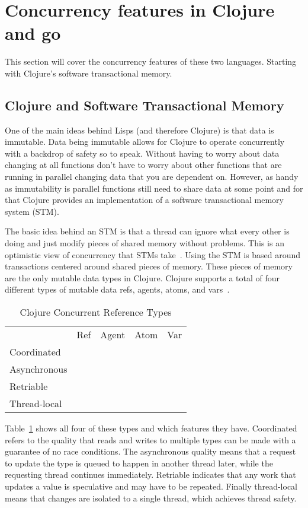 \documentclass{acm_proc_article-sp}
\begin{document}
	\section{Concurrency features in Clojure and go}
	This section will cover the concurrency features of these two languages. Starting with Clojure's software transactional memory.
	
	\subsection{Clojure and Software Transactional Memory}
	One of the main ideas behind Lisps (and therefore Clojure) is that data is immutable. Data being immutable allows for Clojure to operate concurrently with a backdrop of safety so to speak. Without having to worry about data changing at all functions don't have to worry about other functions that are running in parallel changing data that you are dependent on. However, as handy as immutability is parallel functions still need to share data at some point and for that Clojure provides an implementation of a software transactional memory system (STM).
	
	The basic idea behind an STM is that a thread can ignore what every other is doing and just modify pieces of shared memory without problems. This is an optimistic view of concurrency that STMs take~\cite{wiki:stm}. Using the STM is based around transactions centered around shared pieces of memory. These pieces of memory are the only mutable data types in Clojure. Clojure supports a total of four different types of mutable data refs, agents, atoms, and vars~\cite{joy}.
	
	\begin{table}[b]
	\caption{Clojure Concurrent Reference Types\label{types:table}}	
	\begin{tabular}{ | l | c | c | c | c | }
	\hline
	& Ref & Agent & Atom & Var\\
	Coordinated & \checkmark & & &\\
	Asynchronous & & \checkmark & &\\
	Retriable & \checkmark & & \checkmark &\\
	Thread-local & & & & \checkmark\\
	\hline
	\end{tabular}
	\end{table}
	
	Table~\ref{types:table} shows all four of these types and which features they have. Coordinated refers to the quality that reads and writes to multiple types can be made with a guarantee of no race conditions. The asynchronous quality means that a request to update the type is queued to happen in another thread later, while the requesting thread continues immediately. Retriable indicates that any work that updates a value is speculative and may have to be repeated. Finally thread-local means that changes are isolated to a single thread, which achieves thread safety.
	
\end{document}

